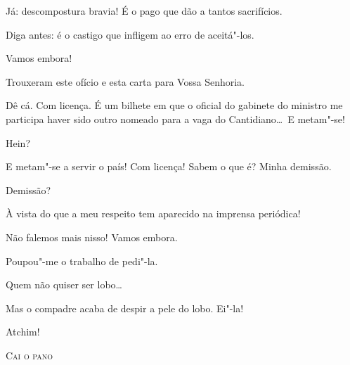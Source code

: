  Já: descompostura bravia! É o pago que dão a tantos
sacrifícios.

 Diga antes: é o castigo que infligem ao erro de aceitá"-los.

  Vamos embora! 




  Trouxeram este ofício e esta carta
para Vossa Senhoria. 

 Dê cá.  Com licença. 
É um bilhete em que o oficial do gabinete do ministro
me participa haver sido outro nomeado para a vaga do Cantidiano\ldots\ E
metam"-se!

 Hein?

 E metam"-se a servir o país!  Com
licença!  Sabem o que
é? Minha demissão.

 Demissão?

 À vista do que a meu respeito tem aparecido na imprensa
periódica!

 Não falemos mais nisso! Vamos embora.

 Poupou"-me o trabalho de pedi"-la.

 Quem não quiser ser lobo\ldots

 Mas o compadre acaba de despir a pele do
lobo.  Ei"-la!

 Atchim! 

\vspace{1cm}

\begin{center}
\textsc{Cai o pano}
\end{center}

